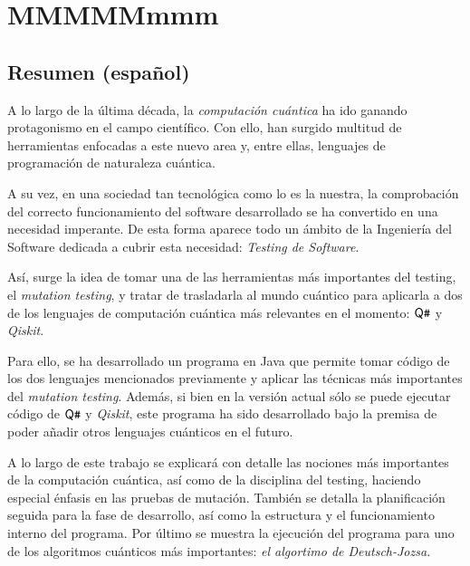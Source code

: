 \chapter{MMMMMmmm}

\section{Resumen (español)}
A lo largo de la última década, la \emph{computación cuántica} ha ido ganando protagonismo en el campo científico. Con ello, han surgido multitud de herramientas enfocadas a este nuevo area y,  entre ellas, lenguajes de programación de naturaleza cuántica.

A su vez, en una sociedad tan tecnológica como lo es la nuestra, la comprobación del correcto funcionamiento del software desarrollado se ha convertido en una necesidad imperante. De esta forma aparece todo un ámbito de la Ingeniería del Software dedicada a cubrir esta necesidad: \emph{Testing de Software}.

Así, surge la idea de tomar una de las herramientas más importantes del testing, el \textit{mutation testing}, y tratar de trasladarla al mundo cuántico para aplicarla a dos de los lenguajes de computación cuántica más relevantes en el momento: $\textsf{Q}\texttt{\#}$  y \textit{Qiskit}.

Para ello, se ha desarrollado un programa en Java que permite tomar código de los dos lenguajes mencionados previamente y aplicar las técnicas más importantes del \textit{mutation testing}. Además, si bien en la versión actual sólo se puede ejecutar código de $\textsf{Q}\texttt{\#}$ y \textit{Qiskit}, este programa ha sido desarrollado bajo la premisa de poder añadir otros lenguajes cuánticos en el futuro.

A lo largo de este trabajo se explicará con detalle las nociones más importantes de la computación cuántica, así como de la disciplina del testing, haciendo especial énfasis en las pruebas de mutación. También se detalla la planificación seguida para la fase de desarrollo, así como la estructura y el funcionamiento interno del programa. Por último se muestra la ejecución del programa para uno de los algoritmos cuánticos más importantes: \textit{el algortimo de Deutsch-Jozsa.}

